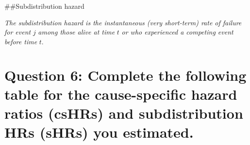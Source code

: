\documentclass[]{article}
\begin{document}
\vspace{6pt} \#\#Subdistribution hazard

\emph{The subdistribution hazard is the instantaneous (very short-term)
rate of failure for event} \(j\) \emph{among those alive at time} \(t\)
\emph{or who experienced a competing event before time} \(t\).

\vspace{12pt}

\section{Question 6: Complete the following table for the cause-specific
hazard ratios (csHRs) and subdistribution HRs (sHRs) you
estimated.}\label{question-6-complete-the-following-table-for-the-cause-specific-hazard-ratios-cshrs-and-subdistribution-hrs-shrs-you-estimated.}
\end{document}

